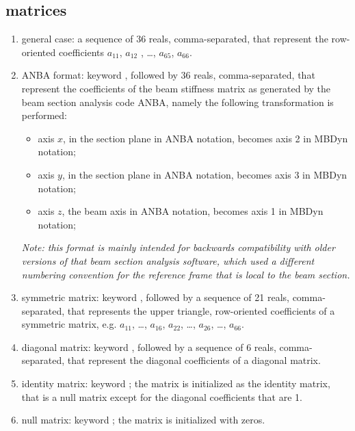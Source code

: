 \subsection{ matrices}
\begin{enumerate}
    \item general case: a sequence of 36 reals, comma-separated, that
    represent the row-oriented coefficients $ a_{11} $, $ a_{12}$ ,
    \ldots, $ a_{65} $, $ a_{66} $.
    \item ANBA format: keyword , followed by 36 reals, 
    comma-separated, that represent the coefficients of the beam stiffness
    matrix as generated by the beam section analysis code ANBA,
    namely the following transformation is performed:
    \begin{itemize}
        \item axis $ x $, in the section plane in ANBA notation, 
	becomes axis 2 in MBDyn notation;    
	\item axis $ y $, in the section plane in ANBA notation, 
	becomes axis 3 in MBDyn notation;    
	\item axis $ z $, the beam axis in ANBA notation, 
	becomes axis 1 in MBDyn notation;    
    \end{itemize}
    \emph{Note: this format is mainly intended for backwards compatibility
    with older versions of that beam section analysis software,
    which used a different numbering convention for the reference frame
    that is local to the beam section.}
    \item symmetric matrix: keyword , followed by a sequence
    of 21 reals, comma-separated, that represents the upper triangle,
    row-oriented coefficients of a symmetric matrix, 
    e.g. $ a_{11} $, \ldots , $ a_{16} $, $ a_{22} $,
    \ldots , $ a_{26} $, \ldots, $ a_{66} $.
    \item diagonal matrix: keyword , followed by a sequence
    of 6 reals, comma-separated, that represent the diagonal coefficients 
    of a diagonal matrix.
    \item identity matrix: keyword ; the matrix is initialized
    as the identity matrix, that is a null matrix except for the diagonal 
    coefficients that are 1.
    \item null matrix: keyword ; the matrix is initialized 
    with zeros.
\end{enumerate}
